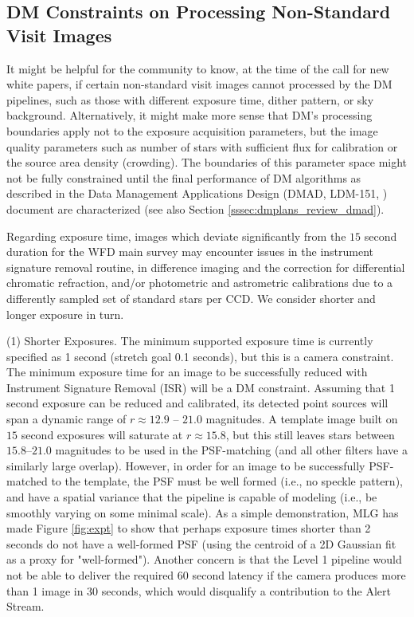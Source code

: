 \documentclass[DM,lsstdraft,toc]{lsstdoc}
\begin{document}
\subsection{DM Constraints on Processing Non-Standard Visit Images}\label{ssec:data_DMconstraints}

It might be helpful for the community to know, at the time of the call for new white papers, if certain non-standard visit images cannot processed by the DM pipelines, such as those with different exposure time, dither pattern, or sky background. Alternatively, it might make more sense that DM's processing boundaries apply not to the exposure acquisition parameters, but the image quality parameters such as number of stars with sufficient flux for calibration or the source area density (crowding). The boundaries of this parameter space might not be fully constrained until the final performance of DM algorithms as described in the Data Management Applications Design (DMAD, LDM-151, \cite{LDM-151}) document are characterized (see also Section \ref{sssec:dmplans_review_dmad}).

Regarding exposure time, images which deviate significantly from the $15$ second duration for the WFD main survey may encounter issues in the instrument signature removal routine, in difference imaging and the correction for differential chromatic refraction, and/or photometric and astrometric calibrations due to a differently sampled set of standard stars per CCD. We consider shorter and longer exposure in turn.

(1) Shorter Exposures. The minimum supported exposure time is currently specified as 1 second (stretch goal 0.1 seconds), but this is a camera constraint. The minimum exposure time for an image to be successfully reduced with Instrument Signature Removal (ISR) will be a DM constraint. Assuming that 1 second exposure can be reduced and calibrated, its detected point sources will span a dynamic range of $r \approx 12.9$ -- $21.0$ magnitudes. A template image built on $15$ second exposures will saturate at $r \approx 15.8$, but this still leaves stars between $15.8$--$21.0$ magnitudes to be used in the PSF-matching (and all other filters have a similarly large overlap). However, in order for an image to be successfully PSF-matched to the template, the PSF must be well formed (i.e., no speckle pattern), and have a spatial variance that the pipeline is capable of modeling (i.e., be smoothly varying on some minimal scale). As a simple demonstration, MLG has made Figure \ref{fig:expt} to show that perhaps exposure times shorter than 2 seconds do not have a well-formed PSF (using the centroid of a 2D Gaussian fit as a proxy for "well-formed"). Another concern is that the Level 1 pipeline would not be able to deliver the required $60$ second latency if the camera produces more than 1 image in 30 seconds, which would disqualify a contribution to the Alert Stream.
\end{document}
